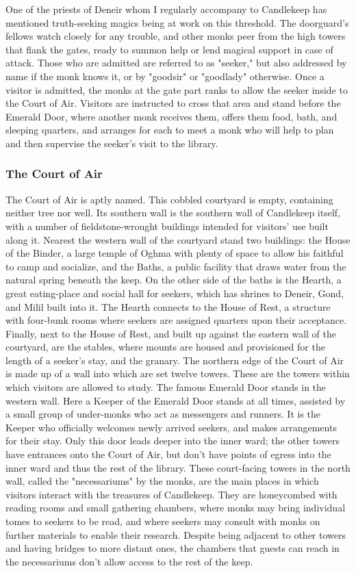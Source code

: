 \documentclass[10pt,a4paper,twoside,twocolumn,openany,bg=print,nodeprecatedcode]{dndbook}
\begin{document}
One of the priests of Deneir whom I regularly accompany to Candlekeep has mentioned truth-seeking magics being at work on this threshold. The doorguard's fellows watch closely for any trouble, and other monks peer from the high towers that flank the gates, ready to summon help or lend magical support in case of attack.
Those who are admitted are referred to as "seeker," but also addressed by name if the monk knows it, or by "goodsir" or "goodlady" otherwise. Once a visitor is admitted, the monks at the gate part ranks to allow the seeker inside to the Court of Air. Visitors are instructed to cross that area and stand before the Emerald Door, where another monk receives them, offers them food, bath, and sleeping quarters, and arranges for each to meet a monk who will help to plan and then supervise the seeker's visit to the library.
\subsubsection{The Court of Air}
The Court of Air is aptly named. This cobbled courtyard is empty, containing neither tree nor well. Its southern wall is the southern wall of Candlekeep itself, with a number of fieldstone-wrought buildings intended for visitors' use built along it. Nearest the western wall of the courtyard stand two buildings: the House of the Binder, a large temple of Oghma with plenty of space to allow his faithful to camp and socialize, and the Baths, a public facility that draws water from the natural spring beneath the keep.
On the other side of the baths is the Hearth, a great eating-place and social hall for seekers, which has shrines to Deneir, Gond, and Milil built into it. The Hearth connects to the House of Rest, a structure with four-bunk rooms where seekers are assigned quarters upon their acceptance. Finally, next to the House of Rest, and built up against the eastern wall of the courtyard, are the stables, where mounts are housed and provisioned for the length of a seeker's stay, and the granary.
The northern edge of the Court of Air is made up of a wall into which are set twelve towers. These are the towers within which visitors are allowed to study. The famous Emerald Door stands in the western wall.
Here a Keeper of the Emerald Door stands at all times, assisted by a small group of under-monks who act as messengers and runners. It is the Keeper who officially welcomes newly arrived seekers, and makes arrangements for their stay. Only this door leads deeper into the inner ward; the other towers have entrances onto the Court of Air, but don't have points of egress into the inner ward and thus the rest of the library.
These court-facing towers in the north wall, called the "necessariums" by the monks, are the main places in which visitors interact with the treasures of Candlekeep. They are honeycombed with reading rooms and small gathering chambers, where monks may bring individual tomes to seekers to be read, and where seekers may consult with monks on further materials to enable their research. Despite being adjacent to other towers and having bridges to more distant ones, the chambers that guests can reach in the necessariums don't allow access to the rest of the keep.
\end{document}
